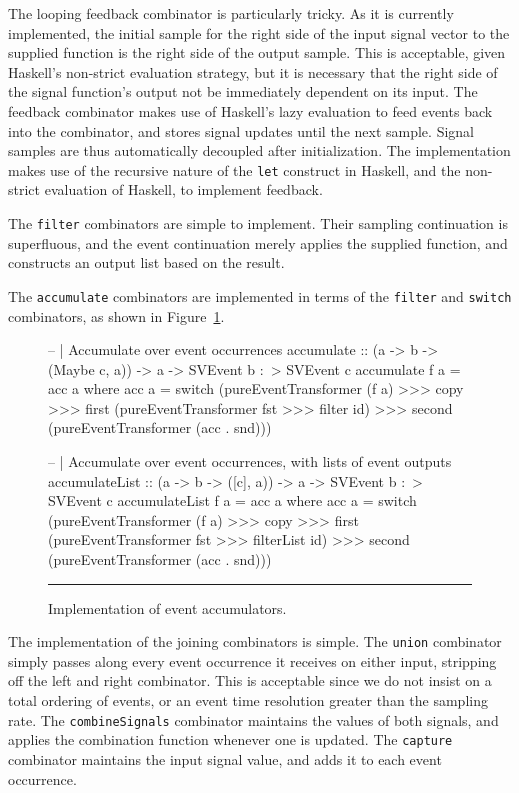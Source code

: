 \documentclass[draft]{llncs}
\begin{document}
The looping feedback combinator is particularly tricky. As it is currently
implemented, the initial sample for the right side of the input signal vector to
the supplied function is the right side of the output sample. This is acceptable,
given Haskell's non-strict evaluation strategy, but it is necessary that the
right side of the signal function's output not be immediately dependent on its
input. The feedback combinator makes use of Haskell's lazy evaluation to
feed events back into the combinator, and stores signal updates until the next
sample. Signal samples are thus automatically decoupled after initialization.
The implementation makes use of the recursive nature of the {\tt let} construct
in Haskell, and the non-strict evaluation of Haskell, to implement feedback.


The {\tt filter} combinators are simple to implement. Their sampling
continuation is superfluous, and the event continuation merely applies the
supplied function, and constructs an output list based on the result.

The {\tt accumulate} combinators are implemented in terms of the {\tt filter}
and {\tt switch} combinators, as shown in
Figure~\ref{figure:accumulate_implementation}.

\begin{figure}
\begin{code}
-- | Accumulate over event occurrences
accumulate :: (a -> b -> (Maybe c, a)) -> a -> SVEvent b :~> SVEvent c
accumulate f a = acc a
  where acc a = switch (pureEventTransformer (f a) >>>
                        copy >>>
                        first (pureEventTransformer fst >>> filter id) >>>
                        second (pureEventTransformer (acc . snd)))

-- | Accumulate over event occurrences, with lists of event outputs
accumulateList :: (a -> b -> ([c], a)) -> a -> SVEvent b :~> SVEvent c
accumulateList f a = acc a
  where acc a = switch (pureEventTransformer (f a) >>>
                        copy >>>
                        first (pureEventTransformer fst >>> filterList id) >>>
                        second (pureEventTransformer (acc . snd)))
\end{code}
\hrule
\caption{Implementation of event accumulators.}
\label{figure:accumulate_implementation}
\end{figure}

The implementation of the joining combinators is simple. The {\tt union}
combinator simply passes along every event occurrence it receives on either
input, stripping off the left and right combinator. This is acceptable since we
do not insist on a total ordering of events, or an event time resolution greater
than the sampling rate. The {\tt combineSignals} combinator maintains the values
of both signals, and applies the combination function whenever one is updated.
The {\tt capture} combinator maintains the input signal value, and adds it to
each event occurrence.
\end{document}
